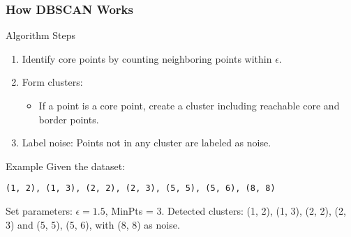 \documentclass[aspectratio=169]{beamer}
\begin{document}
\begin{frame}[fragile]
    \frametitle{How DBSCAN Works}
    \begin{block}{Algorithm Steps}
        \begin{enumerate}
            \item Identify core points by counting neighboring points within $\epsilon$.
            \item Form clusters:
            \begin{itemize}
                \item If a point is a core point, create a cluster including reachable core and border points.
            \end{itemize}
            \item Label noise: Points not in any cluster are labeled as noise.
        \end{enumerate}
    \end{block}

    \begin{block}{Example}
        Given the dataset:
        \begin{lstlisting}
(1, 2), (1, 3), (2, 2), (2, 3), (5, 5), (5, 6), (8, 8)
        \end{lstlisting}
        Set parameters: $\epsilon = 1.5$, MinPts = 3.
        Detected clusters: {(1, 2), (1, 3), (2, 2), (2, 3)} and {(5, 5), (5, 6)}, with (8, 8) as noise.
    \end{block}
\end{frame}
\end{document}
